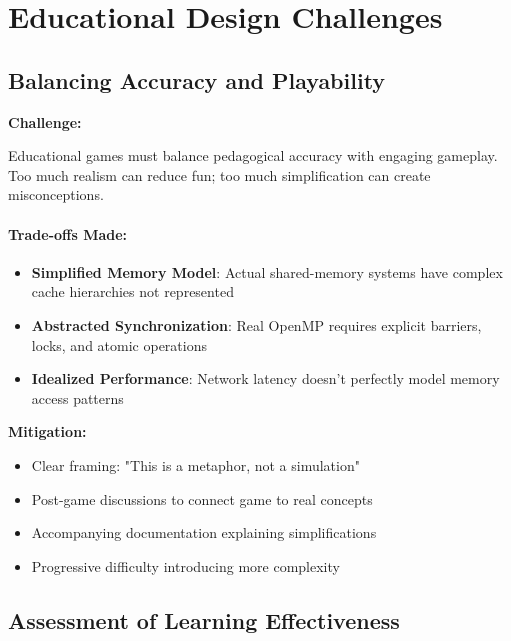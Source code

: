 \section{Educational Design Challenges}
\label{sec:educational-challenges}

\subsection{Balancing Accuracy and Playability}
\label{subsec:accuracy-vs-playability}

\textbf{Challenge:}

Educational games must balance pedagogical accuracy with engaging gameplay. Too much realism can reduce fun; too much simplification can create misconceptions.

\paragraph*{Trade-offs Made:}

\begin{itemize}
    \item \textbf{Simplified Memory Model}: Actual shared-memory systems have complex cache hierarchies not represented
    \item \textbf{Abstracted Synchronization}: Real OpenMP requires explicit barriers, locks, and atomic operations
    \item \textbf{Idealized Performance}: Network latency doesn't perfectly model memory access patterns
\end{itemize}

\textbf{Mitigation:}

\begin{itemize}
    \item Clear framing: "This is a metaphor, not a simulation"
    \item Post-game discussions to connect game to real concepts
    \item Accompanying documentation explaining simplifications
    \item Progressive difficulty introducing more complexity
\end{itemize}

\subsection{Assessment of Learning Effectiveness}
\label{subsec:learning-assessment}

